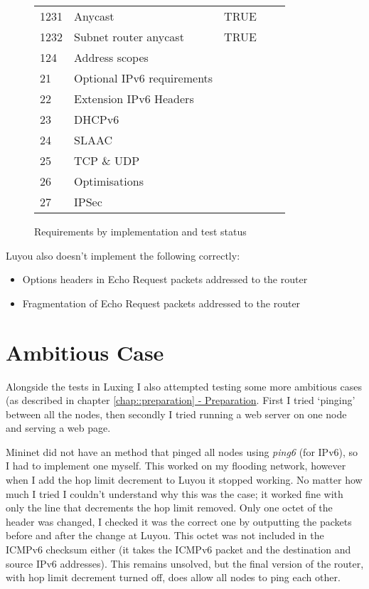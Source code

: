 \documentclass[12pt,a4paper,twoside,openany]{report}
\begin{document}
\begin{figure}
\begin{tabular}{lllll}
1231       & Anycast                     & TRUE    &             &            \\
1232       & Subnet router anycast       & TRUE    &             &            \\
124        & Address scopes              &         &             &            \\
21         & Optional IPv6 requirements              &         &             &            \\
22         & Extension IPv6 Headers           &         &             &            \\
23         & DHCPv6                      &         &             &            \\
24         & SLAAC                       &         &             &            \\
25         & TCP \& UDP                   &         &             &            \\
26         & Optimisations                &         &             &            \\
27         & IPSec                       &         &             &           
\end{tabular}
\caption{Requirements by implementation and test status}
\label{fig::test_status}
\end{figure}

\bigskip

Luyou also doesn't implement the following correctly:
\begin{itemize}
\item Options headers in Echo Request packets addressed to the router
\item Fragmentation of Echo Request packets addressed to the router
\end{itemize}


\section{Ambitious Case}

Alongside the tests in Luxing I also attempted testing some more ambitious cases (as described in chapter \ref{chap::preparation}\hyperref[chap::preparation]{ - Preparation}.  First I tried `pinging' between all the nodes, then secondly I tried running a web server on one node and serving a web page.

\bigskip

Mininet did not have an method that pinged all nodes using \textit{ping6} (for IPv6), so I had to implement one myself.  This worked on my flooding network, however when I add the hop limit decrement to Luyou it stopped working. No matter how much I tried I couldn't understand why this was the case; it worked fine with only the line that decrements the hop limit removed. Only one octet of the header was changed, I checked it was the correct one by outputting the packets before and after the change at Luyou.  This octet was not included in the ICMPv6 checksum either (it takes the ICMPv6 packet and the destination and source IPv6 addresses).  This remains unsolved, but the final version of the router, with hop limit decrement turned off, does allow all nodes to ping each other.
\end{document}
